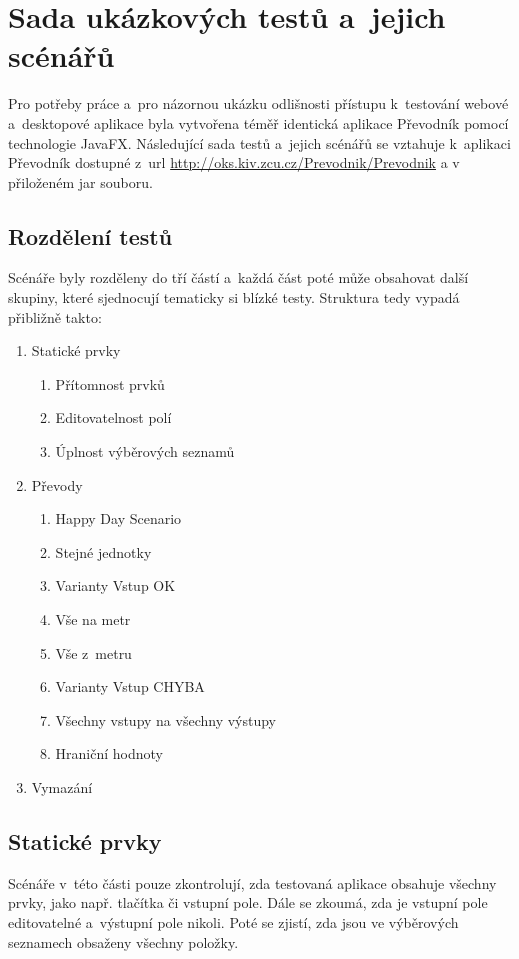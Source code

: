 \chapter{Sada ukázkových testů a~jejich scénářů}
Pro potřeby práce a~pro názornou ukázku odlišnosti přístupu k~testování webové a~desktopové aplikace byla vytvořena téměř identická aplikace Převodník pomocí technologie JavaFX. Následující sada testů a~jejich scénářů se vztahuje k~aplikaci Převodník dostupné z~url \url{http://oks.kiv.zcu.cz/Prevodnik/Prevodnik} a v přiloženém jar souboru.

	\section{Rozdělení testů}
	Scénáře byly rozděleny do tří částí a~každá část poté může obsahovat další skupiny, které sjednocují tematicky si blízké testy. Struktura tedy vypadá přibližně takto:
		{\renewcommand{\labelenumii}{\theenumii}
		\renewcommand{\theenumii}{\theenumi.\arabic{enumii}.}
		\begin{enumerate}
		\item Statické prvky
			\begin{enumerate}
			\item Přítomnost prvků
			\item Editovatelnost polí
			\item Úplnost výběrových seznamů
			\end{enumerate}
		\item Převody
			\begin{enumerate}
			\item Happy Day Scenario
			\item Stejné jednotky
			\item Varianty Vstup OK
			\item Vše na metr
			\item Vše z~metru
			\item Varianty Vstup CHYBA
			\item Všechny vstupy na všechny výstupy
			\item Hraniční hodnoty
			\end{enumerate}
		\item Vymazání
		\end{enumerate}}
		
	\section{Statické prvky}
	Scénáře v~této části pouze zkontrolují, zda testovaná aplikace obsahuje všechny prvky, jako např. tlačítka či vstupní pole. Dále se zkoumá, zda je vstupní pole editovatelné a~výstupní pole nikoli. Poté se zjistí, zda jsou ve výběrových seznamech obsaženy všechny položky.
	
